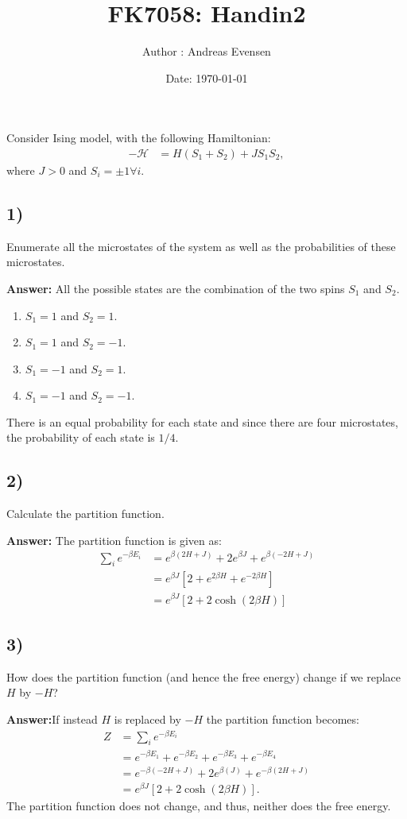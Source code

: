 \documentclass[a4paper]{article}
\title{FK7058: Handin2}
\author{Author : Andreas Evensen}
\date{Date: \today}
\newcommand{\newparagraph}{\vspace{.5cm}\noindent}
\begin{document}
\maketitle
\noindent
Consider Ising model, with the following Hamiltonian:
\begin{align*}
    -\mathcal{H} &= H(S_1 + S_2) + JS_1S_2,
\end{align*}where $J >0$ and $S_i = \pm 1 \forall i$.

\subsection*{1)}
Enumerate all the microstates of the system as well as the probabilities of these microstates.

\newparagraph
\textbf{Answer:} All the possible states are the combination of the two spins $S_1$ and $S_2$.
\begin{enumerate}
    \item $S_1 = 1$ and $S_2 = 1$. 
    \item $S_1 = 1$ and $S_2 = -1$. 
    \item $S_1 = -1$ and $S_2 = 1$. 
    \item $S_1 = -1$ and $S_2 = -1$. 
\end{enumerate}There is an equal probability for each state and since there are four microstates, the probability of each state is $1/4$.

\subsection*{2)}
Calculate the partition function.

\newparagraph
\textbf{Answer:} The partition function is given as:
\begin{align*}
    \sum_i e^{-\beta E_i} &= e^{\beta(2H + J)} + 2e^{\beta J} + e^{\beta(-2H + J)}\\
    &= e^{\beta J}\left[2 + e^{2\beta H} + e^{-2\beta H}\right]\\
    &= e^{\beta J}\left[2 + 2\cosh(2\beta H)\right]
\end{align*}

\subsection*{3)}
How does the partition function (and hence the free energy) change if we replace $H$ by $-H$?

\newparagraph
\textbf{Answer:}If instead $H$ is replaced by $-H$ the partition function becomes:
\begin{align*}
    Z &= \sum_i e^{-\beta E_i}\\
    &=e^{-\beta E_1} + e^{-\beta E_2} + e^{-\beta E_3} + e^{-\beta E_4}\\
    &= e^{-\beta (-2H + J)} + 2e^{\beta (J)} + e^{-\beta (2H + J)}\\
    &= e^{\beta J}\left[2 + 2\cosh(2\beta H)\right].
\end{align*}The partition function does not change, and thus, neither does the free energy.
\end{document}
